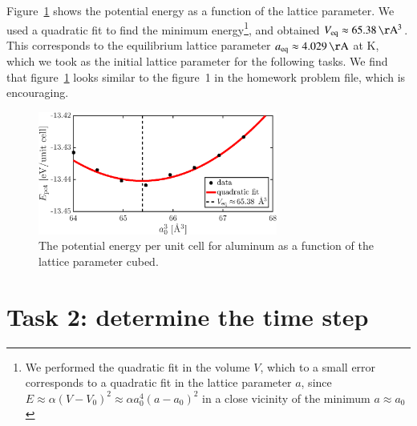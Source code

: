 Figure~\ref{fig1} shows the potential energy as a function of the lattice parameter. We used a quadratic fit to find the minimum energy\footnote{We performed the quadratic fit in the volume $V$, which to a small error corresponds to a quadratic fit in the lattice parameter $a$, since $E \approx  \alpha(V-V_0)^2 \approx \alpha a_0^4 (a-a_0)^2$ in a close vicinity of the minimum $a\approx a_0$}, and obtained $V_{\rm eq} \approx \unit[65.38]{\AA^3}$. This corresponds to the equilibrium lattice parameter $a_{\rm eq} \approx \unit[4.029]{\AA}$ at \unit[0]{K}, which we took as the initial lattice parameter for the following tasks.  We find that figure~\ref{fig1} looks similar to the figure~1 in the homework problem file, which is encouraging.
\begin{figure}[!ht]
\begin{center}
  \includegraphics[width=0.7\textwidth]{../figures/potential_energy} 
  \caption{The potential energy per unit cell for aluminum as a function of the lattice parameter cubed.}
  \label{fig1}
\end{center}
\end{figure}

\section*{Task 2: determine the time step}


